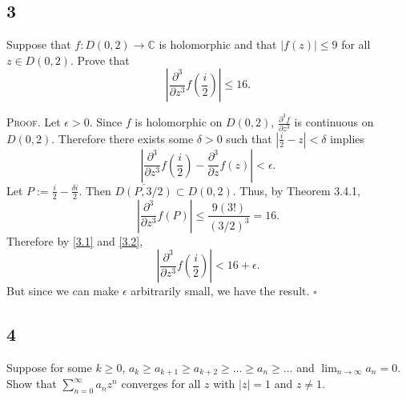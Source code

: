 \documentclass[12pt]{article}
\newcounter{ProofCounter}
\newenvironment{Proof}{\stepcounter{ProofCounter}\textsc{Proof.}}{\hfill$\square$}
\begin{document}
\subsection*{3}
\begin{tcolorbox}
Suppose that $f : D(0,2) \rightarrow \mathbb{C}$ is holomorphic and that $|f(z)| \leq 9$ for all $z \in D(0,2)$. Prove that 
\[ \left| \frac{\partial^{3}}{\partial z^{3}}f\left( \frac{i}{2} \right)\right| \leq 16. \]
\end{tcolorbox}
\begin{Proof}
Let $\epsilon > 0$. Since $f$ is holomorphic on $D(0,2)$, $\frac{\partial^{3}f}{\partial z^{3}}$ is continuous on $D(0,2)$. Therefore there exists 
some $\delta > 0$ such that $\left|\frac{i}{2} - z\right| < \delta$ implies 
\begin{equation}
\left|\frac{\partial^{3}}{\partial z^{3}}f\left( \frac{i}{2} \right) - \frac{\partial^{3}}{\partial z}f(z)\right| < \epsilon.
\label{3.1}
\end{equation}
Let $P := \frac{i}{2} - \frac{\delta i}{2}$. Then $\overline{D(P,3/2)} \subset D(0,2)$. Thus, by Theorem 3.4.1,
\begin{equation}
\left| \frac{\partial^{3}}{\partial z^{3}}f\left( P \right)\right| \leq \frac{9(3!)}{(3/2)^{3}} = 16.
\label{3.2}
\end{equation}
Therefore by \eqref{3.1} and \eqref{3.2}, 
\[ \left| \frac{\partial^{3}}{\partial z^{3}}f\left( \frac{i}{2} \right)\right| < 16 + \epsilon. \]
But since we can make $\epsilon$ arbitrarily small, we have the result.
\end{Proof}


\newpage 
\subsection*{4}
\begin{tcolorbox}
Suppose for some $k \geq 0$, $a_{k} \geq a_{k+1} \geq a_{k+2} \geq \dots \geq a_{n} \geq \dots$ and $\lim_{n\rightarrow\infty}a_{n} = 0$. Show that 
$\sum_{n=0}^{\infty}a_{n}z^{n}$ converges for all $z$ with $|z| = 1$ and $z\neq 1$.
\end{tcolorbox}
\end{document}
